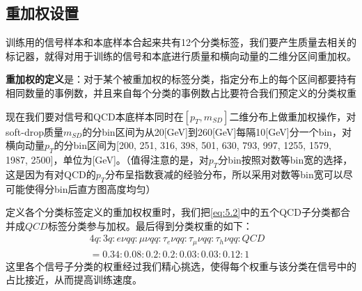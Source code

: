 \subsection{重加权设置}
训练用的信号样本和本底样本合起来共有12个分类标签，我们要产生质量去相关的标记器，就得对用于训练的信号和本底进行质量和横向动量的二维分区间重加权。

\textbf{重加权的定义}是：对于某个被重加权的标签分类，指定分布上的每个区间都要持有相同数量的事例数，并且来自每个分类的事例数占比要符合我们预定义的分类权重

现在我们要对信号和QCD本底样本同时在$[p_T,m_{SD}]$二维分布上做重加权操作，对soft-drop质量$m_{SD}$的分bin区间为从20[GeV]到260[GeV]每隔10[GeV]分一个bin，对横向动量$p_T$的分bin区间为[200, 251, 316, 398, 501, 630, 793, 997, 1255, 1579, 1987, 2500]，单位为[GeV]。（值得注意的是，对$p_T$分bin按照对数等bin宽的选择，这是因为有对QCD的$p_T$分布呈指数衰减的经验分布，所以采用对数等bin宽可以尽可能使得分bin后直方图高度均匀）

定义各个分类标签定义的重加权权重时，我们把\eqref{eq:5.2}中的五个QCD子分类都合并成$QCD$标签分类参与加权。最后得到分类权重的如下：
\begin{equation}
\begin{split}
    4q:3q:e\nu qq:\mu\nu qq:\tau_e\nu qq:\tau_\mu\nu qq:\tau_h\nu qq:QCD \\
    =0.34:0.08:0.2:0.2:0.03:0.03:0.12:1 &
\end{split}
\end{equation}
这里各个信号子分类的权重经过我们精心挑选，使得每个权重与该分类在信号中的占比接近，从而提高训练速度。

